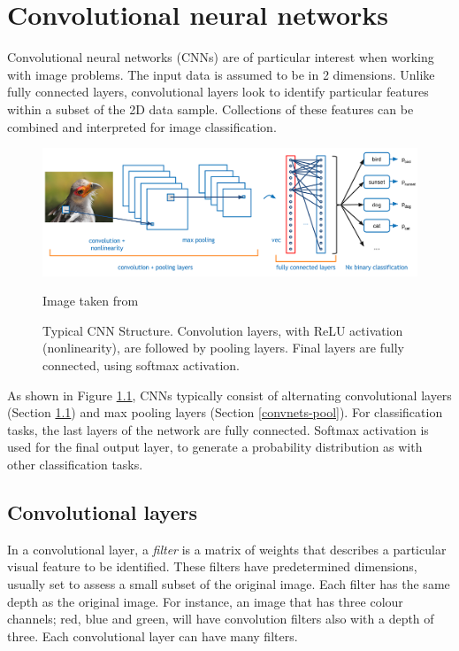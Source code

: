 %
%

\chapter{Convolutional neural networks}\label{convnets}

Convolutional neural networks (CNNs) are of particular interest when working with image problems. The input data is assumed to be in 2 dimensions. Unlike fully connected layers, convolutional layers look to identify particular features within a subset of the 2D data sample. Collections of these features can be combined and interpreted for image classification.

\begin{figure}[ht]
	\centering
	\includegraphics[width=\textwidth]{Images/3_cnn_structure.png}
	\caption{Typical CNN Structure. Convolution layers, with ReLU activation (nonlinearity), are followed by pooling layers. Final layers are fully connected, using softmax activation.}
	\small Image taken from \cite{ADeshpande2016}
	\label{convnets-structurefig}
\end{figure}

As shown in Figure \ref{convnets-structurefig}, CNNs typically consist of alternating convolutional layers (Section \ref{convnets-convlayer}) and max pooling layers (Section \ref{convnets-pool}). For classification tasks, the last layers of the network are fully connected. Softmax activation is used for the final output layer, to generate a probability distribution as with other classification tasks.

\section{Convolutional layers}\label{convnets-convlayer}

In a convolutional layer, a \textit{filter} is a matrix of weights that describes a particular visual feature to be identified. These filters have predetermined dimensions, usually set to assess a small subset of the original image. Each filter has the same depth as the original image. For instance, an image that has three colour channels; red, blue and green, will have convolution filters also with a depth of three. Each convolutional layer can have many filters.

